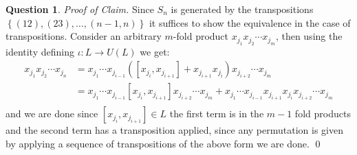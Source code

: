 \documentclass[10.5pt]{article}
\theoremstyle{definition}
\newtheorem{pb}{Question}
\numberwithin{example}{subsection}
\numberwithin{proposition}{subsection}
\newcommand{\set}[1]{\left\{#1\right\}}
\begin{document}
\begin{pb}
        \emph{Proof of Claim.} Since \(S_n\) is generated by the transpositions \(\set{(12),(23),\hdots,(n-1,n)}\) it suffices to show the equivalence in the case of transpositions. Consider an arbitrary \(m\)-fold product \(x_{j_1}x_{j_2}\cdots x_{j_m}\), then using the identity defining \(\iota: L \to U(L)\) we get:
        \begin{align}
            x_{j_1}x_{j_2}\cdots x_{j_n} &= x_{j_1}\cdots x_{j_{i-1}} ([x_{j_{i}},x_{j_{i+1}}] + x_{j_{i+1}} x_{j_i})x_{j_{i+2}}\cdots x_{j_m} \\
            &= x_{j_1}\cdots x_{j_{i-1}} [x_{j_{i}},x_{j_{i+1}}]x_{j_{i+2}}\cdots x_{j_m} + x_{j_1}\cdots x_{j_{i-1}} x_{j_{i+1}} x_{j_i}x_{j_{i+2}}\cdots x_{j_m} \\
        \end{align}
        and we are done since \([x_{j_{i}},x_{j_{i+1}}] \in L\) the first term is in the \(m-1\) fold products and the second term has a transposition applied, since any permutation is given by applying a sequence of transpositions of the above form we are done. \qed


\end{pb}
\end{document}

